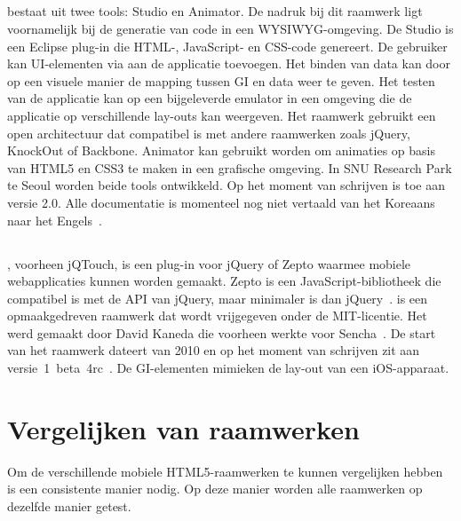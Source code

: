 \subsection{\davinci}%
\davinci{} bestaat uit twee tools:  \davinci{} Studio en \davinci{} Animator.
De nadruk bij dit raamwerk ligt voornamelijk bij de generatie van code in een WYSIWYG-omgeving.
De \davinci{} Studio is een Eclipse plug-in die HTML-,  JavaScript- en CSS-code genereert.
De gebruiker kan UI-elementen via  aan de applicatie toevoegen.
Het binden van data kan door op een visuele manier de mapping tussen GI en data weer te geven.
Het testen van de applicatie kan op een bijgeleverde emulator in een  omgeving die de applicatie op verschillende lay-outs kan weergeven.
Het raamwerk gebruikt een open architectuur dat compatibel is met andere  raamwerken zoals jQuery, KnockOut of Backbone.
\davinci{} Animator kan gebruikt worden om animaties op basis van HTML5 en CSS3 te maken in een grafische omgeving.
In SNU Research Park te Seoul worden beide tools ontwikkeld.
Op het moment van schrijven is \davinci{} toe aan versie 2.0.  
Alle documentatie is momenteel nog niet vertaald van het Koreaans naar het Engels~\cite{Incross}.


\subsection{\jqt}%
\jqt{}, voorheen jQTouch, is een plug-in voor jQuery of Zepto waarmee mobiele webapplicaties kunnen worden gemaakt.
Zepto is een JavaScript-bibliotheek die compatibel is met de API van jQuery, maar minimaler is dan jQuery~\cite{Zepto2013}.
\jqt{} is een opmaakgedreven raamwerk dat wordt vrijgegeven onder de MIT-licentie.
Het werd gemaakt door David Kaneda die voorheen werkte voor Sencha~\cite{JQT2013,Kaneda2013}.
De start van het raamwerk dateert van 2010 en op het moment van schrijven zit \jqt{} aan versie~1~beta~4rc~\cite{JQTouch2010,JQT2013}.
De GI-elementen mimieken de lay-out van een iOS-apparaat.

 

\section{Vergelijken van raamwerken} 
\label{sec:vergelijken-raamwerken}
Om de verschillende mobiele HTML5-raamwerken te kunnen vergelijken hebben is een consistente manier nodig.  
Op deze manier worden alle raamwerken op dezelfde manier getest.

